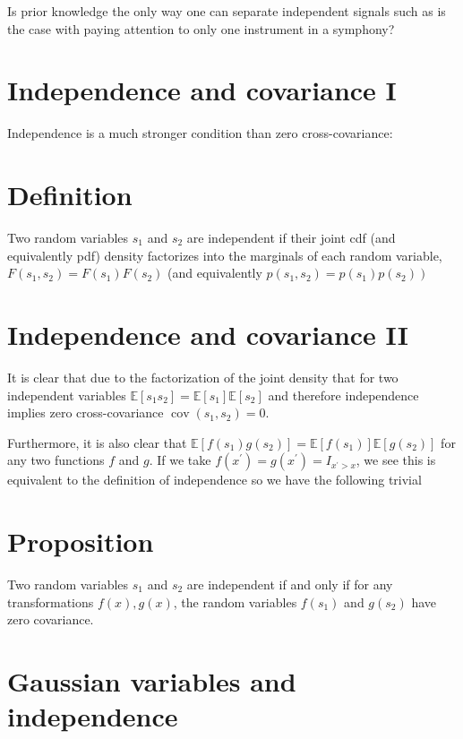 \documentclass[11pt]{article}
\theoremstyle{plain} %
\theoremstyle{remark}
\begin{document}
Is prior knowledge the only way one can separate independent signals such as is
the case with paying attention to only one instrument in a symphony?

\section*{Independence and covariance I}
Independence is a much stronger condition than zero cross-covariance:

\section*{Definition}
Two random variables $s_{1}$ and $s_{2}$ are independent if their joint cdf (and
equivalently pdf) density factorizes into the marginals of each random variable,
$F\left(s_{1}, s_{2}\right)=F\left(s_{1}\right) F\left(s_{2}\right)$ (and
equivalently $\left.p\left(s_{1}, s_{2}\right)=p\left(s_{1}\right)
p\left(s_{2}\right)\right)$

\section*{Independence and covariance II}
It is clear that due to the factorization of the joint density that for two
independent variables $\mathbb{E}\left[s_{1}
s_{2}\right]=\mathbb{E}\left[s_{1}\right] \mathbb{E}\left[s_{2}\right]$ and
therefore independence implies zero cross-covariance
$\operatorname{cov}\left(s_{1}, s_{2}\right)=0$.

Furthermore, it is also clear that $\mathbb{E}\left[f\left(s_{1}\right)
g\left(s_{2}\right)\right]=\mathbb{E}\left[f\left(s_{1}\right)\right]
\mathbb{E}\left[g\left(s_{2}\right)\right]$ for any two functions $f$ and $g$.
If we take $f\left(x^{\prime}\right)=g\left(x^{\prime}\right)=I_{x^{\prime}>x}$,
we see this is equivalent to the definition of independence so we have the
following trivial

\section*{Proposition}
Two random variables $s_{1}$ and $s_{2}$ are independent if and only if for any
transformations $f(x), g(x)$, the random variables $f\left(s_{1}\right)$ and
$g\left(s_{2}\right)$ have zero covariance.

\section*{Gaussian variables and independence}
\end{document}
